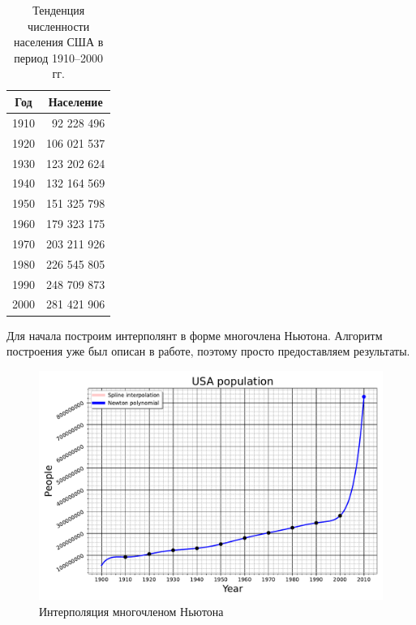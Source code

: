 		\begin{table}[h!]
			\centering
				\begin{tabular}{|c|r|}
					\hline
					Год  & \multicolumn{1}{c|}{Население} \\ \hline
					1910 & 92 228 496                                 \\ \hline
					1920 & 106 021 537                                \\ \hline
					1930 & 123 202 624                                \\ \hline
					1940 & 132 164 569                                \\ \hline
					1950 & 151 325 798                                \\ \hline
					1960 & 179 323 175                                \\ \hline
					1970 & 203 211 926                                \\ \hline
					1980 & 226 545 805                                \\ \hline
					1990 & 248 709 873                                \\ \hline
					2000 & 281 421 906                                \\ \hline
				\end{tabular}
			\caption{Тенденция численности населения США в период 1910--2000 гг.}
		\end{table}
	
		\newpage
		Для начала построим интерполянт в форме многочлена Ньютона. Алгоритм построения уже был описан в работе, поэтому просто предоставляем результаты.
	
		\begin{figure}[h!]
			\centering
			\includegraphics[width=\linewidth]{Pictures/Newton.pdf}
			\caption{Интерполяция многочленом Ньютона}
		\end{figure}
	
